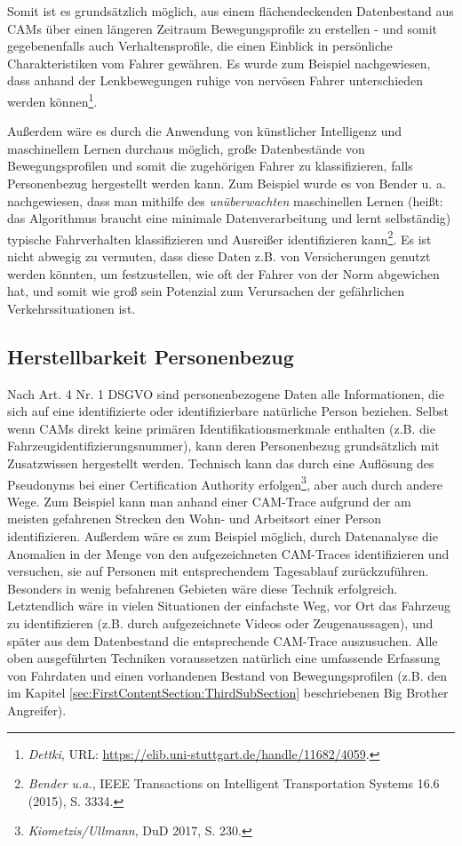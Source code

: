 Somit ist es grundsätzlich möglich, aus einem flächendeckenden Datenbestand aus CAMs über einen längeren Zeitraum Bewegungsprofile zu erstellen - und somit gegebenenfalls auch Verhaltensprofile, die einen Einblick in persönliche Charakteristiken vom Fahrer gewähren. Es\nocite{Dettki2005} wurde zum Beispiel nachgewiesen, dass anhand der Lenkbewegungen ruhige von nervösen Fahrer unterschieden werden können\footnote{\emph{Dettki}, URL: \url{https://elib.uni-stuttgart.de/handle/11682/4059}.}. 

Außerdem wäre es durch die Anwendung von künstlicher Intelligenz und maschinellem Lernen durchaus möglich, große Datenbestände von Bewegungsprofilen und somit die zugehörigen Fahrer zu klassifizieren, falls Personenbezug hergestellt werden kann. Zum Beispiel wurde es von Bender u. a. \nocite{unsupervised}nachgewiesen, dass man mithilfe des \textit{unüberwachten} maschinellen Lernen (heißt: das Algorithmus braucht eine minimale Datenverarbeitung und lernt selbständig) typische Fahrverhalten klassifizieren und Ausreißer identifizieren kann\footnote{\emph{Bender u.a.}, IEEE Transactions on Intelligent Transportation Systems 16.6 (2015), S. 3334.}. Es ist nicht abwegig zu vermuten, dass diese Daten z.B. von Versicherungen genutzt werden könnten, um festzustellen, wie oft der Fahrer von der Norm abgewichen hat, und somit wie groß sein Potenzial zum Verursachen der gefährlichen Verkehrssituationen ist.

\subsection{Herstellbarkeit Personenbezug}
\label{sec:SecondContentSection:SecondSubsection:SecondSubSubsection}

Nach Art. 4 Nr. 1 DSGVO sind personenbezogene Daten alle Informationen, die sich auf eine identifizierte oder identifizierbare natürliche Person beziehen. Selbst wenn CAMs direkt keine primären Identifikationsmerkmale enthalten (z.B. die Fahrzeugidentifizierungsnummer), kann deren Personenbezug grundsätzlich mit Zusatzwissen hergestellt werden. Technisch kann das durch eine Auflösung des Pseudonyms bei einer Certification Authority erfolgen\footnote{\emph{Kiometzis/Ullmann}, DuD 2017, S. 230.}\nocite{Kiometzis2017}, aber auch durch andere Wege. Zum Beispiel kann man anhand einer CAM-Trace aufgrund der am meisten gefahrenen Strecken den Wohn- und Arbeitsort einer Person identifizieren. Außerdem wäre es zum Beispiel möglich, durch Datenanalyse die Anomalien in der Menge von den aufgezeichneten CAM-Traces identifizieren und versuchen, sie auf Personen mit entsprechendem Tagesablauf zurückzuführen. Besonders in wenig befahrenen Gebieten wäre diese Technik erfolgreich. Letztendlich wäre in vielen Situationen der einfachste Weg, vor Ort das Fahrzeug zu identifizieren (z.B. durch aufgezeichnete Videos oder Zeugenaussagen), und später aus dem Datenbestand die entsprechende CAM-Trace auszusuchen. Alle oben ausgeführten Techniken voraussetzen natürlich eine umfassende Erfassung von Fahrdaten und einen vorhandenen Bestand von Bewegungsprofilen (z.B. den im Kapitel \ref{sec:FirstContentSection:ThirdSubSection} beschriebenen Big Brother Angreifer).

